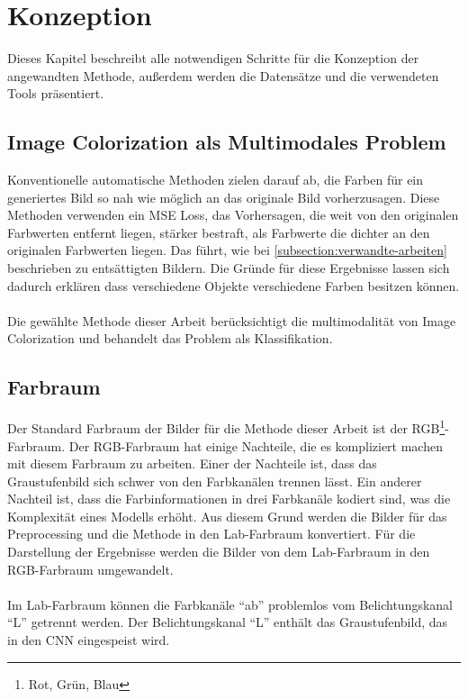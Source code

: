 \chapter{Konzeption}
Dieses Kapitel beschreibt alle notwendigen Schritte für die Konzeption der angewandten Methode, außerdem werden die Datensätze
und die verwendeten Tools präsentiert.

\section{Image Colorization als Multimodales Problem}
Konventionelle automatische Methoden zielen darauf ab, die Farben für ein generiertes Bild so nah wie möglich an das originale Bild vorherzusagen.
Diese Methoden verwenden ein MSE Loss, das Vorhersagen, die weit von den originalen Farbwerten entfernt liegen, stärker bestraft, als Farbwerte
die dichter an den originalen Farbwerten liegen. Das führt, wie bei \ref{subsection:verwandte-arbeiten} beschrieben zu entsättigten Bildern.
Die Gründe für diese Ergebnisse lassen sich dadurch erklären dass verschiedene Objekte verschiedene Farben besitzen können. 
\\
\\
Die gewählte Methode dieser Arbeit berücksichtigt die multimodalität von Image Colorization und behandelt das Problem als Klassifikation.

\section{Farbraum}
Der Standard Farbraum der Bilder für die Methode dieser Arbeit ist der RGB\footnote{Rot, Grün, Blau}-Farbraum. 
Der RGB-Farbraum hat einige Nachteile, die es kompliziert
machen mit diesem Farbraum zu arbeiten. Einer der Nachteile ist, dass das Graustufenbild sich schwer von den Farbkanälen trennen lässt. Ein anderer
Nachteil ist, dass die Farbinformationen in drei Farbkanäle kodiert sind, was die Komplexität eines Modells erhöht. Aus diesem Grund
werden die Bilder für das Preprocessing und die Methode in den Lab-Farbraum konvertiert. Für die Darstellung der Ergebnisse werden die Bilder
von dem Lab-Farbraum in den RGB-Farbraum umgewandelt.
\\
\\
Im Lab-Farbraum können die Farbkanäle ``ab'' problemlos vom Belichtungskanal ``L'' getrennt werden. Der Belichtungskanal ``L'' 
enthält das Graustufenbild, das in den CNN eingespeist wird.


